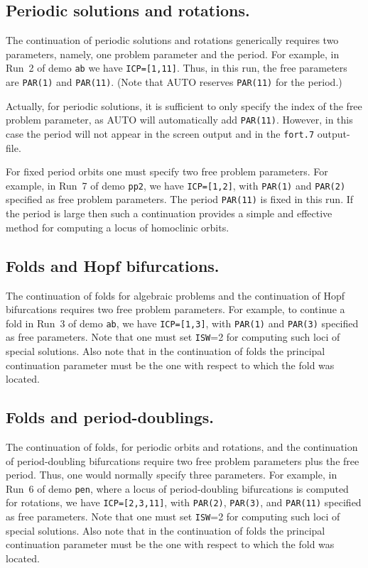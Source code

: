 \documentclass[12pt]{report}
\begin{document}
\subsection{ Periodic solutions and rotations.}
The continuation of periodic solutions and rotations generically requires 
two parameters, namely, one problem parameter and the period.
For example, in Run~2 of demo {\tt ab} we have {\tt ICP=[1,11]}.
Thus, in this run, the free parameters are {\tt PAR(1)} and {\tt PAR(11)}.
(Note that {\cal AUTO} reserves {\tt PAR(11)} for the period.)

Actually, for periodic solutions, it is sufficient to only specify 
the index of the free problem parameter, as {\cal AUTO} will automatically 
add {\tt PAR(11)}.
However, in this case the period will not appear in the screen output 
and in the {\tt fort.7} output-file. 

For fixed period orbits one must specify two free problem 
parameters.
For example, in Run~7 of demo {\tt pp2}, we have {\tt ICP=[1,2]}, with 
{\tt PAR(1)} and {\tt PAR(2)}
specified as free problem parameters.
The period {\tt PAR(11)} is fixed in this run.
If the period is large then such a continuation provides a simple and 
effective method for computing a locus of homoclinic orbits.
\subsection{ Folds and Hopf bifurcations.}
The continuation of folds for algebraic problems and the continuation of
Hopf bifurcations requires two free problem parameters.
For example, to continue a fold in Run~3 of demo {\tt ab}, we have {\tt ICP=[1,3]}, 
with {\tt PAR(1)} and {\tt PAR(3)} specified as free parameters.
Note that one must set {\tt ISW}=2 for computing such loci of special solutions.
Also note that in the continuation of folds the principal continuation parameter
must be the one with respect to which the fold was located.

\subsection{ Folds and period-doublings.}
The continuation of folds, for periodic orbits and rotations,
and the continuation of period-doubling bifurcations require two free 
problem parameters plus the free period. Thus, one would normally
specify three parameters.
For example, in Run~6 of demo {\tt pen}, where a locus of period-doubling
bifurcations is computed for rotations, we have {\tt ICP=[2,3,11]}, 
with {\tt PAR(2)}, {\tt PAR(3)}, and {\tt PAR(11)} specified as free parameters. 
Note that one must set {\tt ISW}=2 for computing such loci of special solutions.
Also note that in the continuation of folds the principal continuation parameter
must be the one with respect to which the fold was located.
\end{document}
